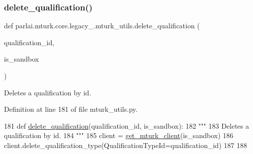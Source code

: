 \mbox{\label{namespaceparlai_1_1mturk_1_1core_1_1legacy__2018_1_1mturk__utils_a5c70873375e623d8d95012fa4cde22d1}} 
\subsubsection{\texorpdfstring{delete\+\_\+qualification()}{delete\_qualification()}}
{\footnotesize\ttfamily def parlai.\+mturk.\+core.\+legacy\+\_.\+mturk\+\_\+utils.\+delete\+\_\+qualification (\begin{DoxyParamCaption}\item[{}]{qualification\+\_\+id,  }\item[{}]{is\+\_\+sandbox }\end{DoxyParamCaption})}

\begin{DoxyVerb}Deletes a qualification by id.
\end{DoxyVerb}
 

Definition at line 181 of file mturk\+\_\+utils.\+py.


\begin{DoxyCode}
181 \textcolor{keyword}{def }\hyperlink{namespaceparlai_1_1mturk_1_1core_1_1mturk__utils_a389ca1d743e6319cb35916a6b0d7867d}{delete\_qualification}(qualification\_id, is\_sandbox):
182     \textcolor{stringliteral}{"""}
183 \textcolor{stringliteral}{    Deletes a qualification by id.}
184 \textcolor{stringliteral}{    """}
185     client = \hyperlink{namespaceparlai_1_1mturk_1_1core_1_1mturk__utils_a577e2527c04682284394b0951a090695}{get\_mturk\_client}(is\_sandbox)
186     client.delete\_qualification\_type(QualificationTypeId=qualification\_id)
187 
188 
\end{DoxyCode}
\mbox{\label{namespaceparlai_1_1mturk_1_1core_1_1legacy__2018_1_1mturk__utils_ac63e0052296484ca3430408e19327c54}} 
